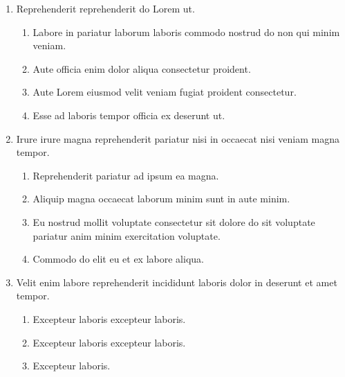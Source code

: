 \documentclass[a4paper,12pt]{article}
\begin{document}
\begin{enumerate}[label=\textbf{\arabic*.}]
\begin{multicols}{2}
\end{multicols}
\item Reprehenderit reprehenderit do Lorem ut.
\begin{multicols}{2}
	\begin{enumerate}
		\item  Labore in pariatur laborum laboris commodo nostrud do non qui minim veniam.
    
		\item  Aute officia enim dolor aliqua consectetur proident.
    
		\item  Aute Lorem eiusmod velit veniam fugiat proident consectetur.
  
		\item  Esse ad laboris tempor officia ex deserunt ut.
    
	\end{enumerate}

\end{multicols}
\item Irure irure magna reprehenderit pariatur nisi in occaecat nisi veniam magna tempor.
\begin{multicols}{2}
	\begin{enumerate}
		\item  Reprehenderit pariatur ad ipsum ea magna.
  
		\item  Aliquip magna occaecat laborum minim sunt in aute minim.
    
		\item  Eu nostrud mollit voluptate consectetur sit dolore do sit voluptate pariatur anim minim exercitation voluptate.
    
		\item  Commodo do elit eu et ex labore aliqua.
    
	\end{enumerate}

\end{multicols}
\item Velit enim labore reprehenderit incididunt laboris dolor in deserunt et amet tempor.
\begin{multicols}{2}
	\begin{enumerate}
		\item  Excepteur laboris excepteur laboris.
    
		\item  Excepteur laboris excepteur laboris.
  
		\item  Excepteur laboris.
    

\end{enumerate}
\end{multicols}
\end{enumerate}
\end{document}
